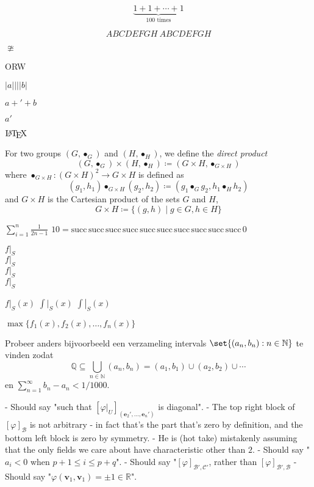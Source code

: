 \documentclass[12pt,fleqn,a4paper]{article}
\newcommand*\N{\mathbb N}
\newcommand*\Q{\mathbb Q}
\newcommand*\restrict[2]{\ensuremath{#1|_{#2}}}
\newcommand*\arestrict[2]{\ensuremath{\left.#1\right|_{#2}}}
\begin{document}
\begin{equation*}
 \underbrace{
  1 + 1 + \dotsb + 1
 }_{\text{\(100\) times}}
\end{equation*}

\begin{equation*}
 \mathit{ABCDEFGH}\ ABCDEFGH
\end{equation*}

\(\ncong\)

{\Huge ORW}

\(\lvert a \rvert || \lvert b \rvert\)

\(a + \prime + b\)

\(a\prime\)

\(\text\LaTeX\)

For two groups \((G, \bullet_G)\) and \((H, \bullet_H)\), we define the
\emph{direct product}
\begin{equation*}
 (G, \bullet_G) \times (H, \bullet_H)
  \coloneqq (G \times H, \bullet_{G \times H})
\end{equation*}
where \(\bullet_{G \times H}: (G \times H)^2 \to G \times H\) is defined as
\begin{equation*}
 (g_1, h_1) \bullet_{G \times H} (g_2, h_2)
  \coloneqq (g_1 \bullet_G g_2, h_1 \bullet_H h_2)
\end{equation*}
and \(G \times H\) is the Cartesian product of the sets \(G\) and \(H\),
\begin{equation*}
 G \times H \coloneqq \{(g, h) \mid g \in G, h \in H\}
\end{equation*}

\(\sum_{i = 1}^n \frac 1{2n - 1}\)
\(10 = \mathrm{succ}\,\mathrm{succ}\,\mathrm{succ}\,\mathrm{succ}\,\mathrm{succ}\,\mathrm{succ}\,\mathrm{succ}\,\mathrm{succ}\,\mathrm{succ}\,\mathrm{succ}\,0\)

\(f\vert_S\) \\
\(f\rvert_S\) \\
\(f\lvert_S\) \\
\(f|_S\)

\(\restrict fS(x)\)
\(\displaystyle \restrict {\int}S(x)\)
\(\displaystyle \arestrict {\int}S(x)\)

\(\max\{f_1(x), f_2(x), \dotsc, f_n(x)\}\)

Probeer anders bijvoorbeeld een verzameling intervals \(\set{(a_n, b_n) : n \in
\N}\) te vinden zodat
\[\Q \subseteq \bigcup_{n \in \N} (a_n, b_n) = (a_1, b_1) \cup (a_2, b_2) \cup
\dotsb\]
en \(\sum_{n = 1}^\infty b_n - a_n < 1/1000\).

- Should say "such that \([\varphi|_U]_{(\mathbf e_2', ..., \mathbf e_n')}\) is diagonal".
- The top right block of \([\varphi]_{\mathcal B}\) is not arbitrary - in fact that's the part that's zero by definition, and the bottom left block is zero by symmetry.
- He is (hot take) mistakenly assuming that the only fields we care about have characteristic other than \(2\).
- Should say "\(a_i < 0\) when \(p + 1 \le i \le p + q\)".
- Should say "\([\varphi]_{\mathcal B', \mathcal C'}\), rather than \([\varphi]_{\mathcal B', \mathcal B}\)
- Should say "\(\varphi(\mathbf v_1, \mathbf v_1) = \pm 1 \in \mathbb R\)".
\end{document}
